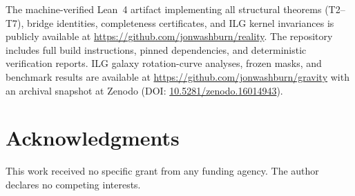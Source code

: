 \documentclass[11pt]{article}
\begin{document}
The machine-verified Lean~4 artifact implementing all structural theorems (T2--T7), bridge identities, completeness certificates, and ILG kernel invariances is publicly available at \href{https://github.com/jonwashburn/reality}{https://github.com/jonwashburn/reality}. The repository includes full build instructions, pinned dependencies, and deterministic verification reports. ILG galaxy rotation-curve analyses, frozen masks, and benchmark results are available at \href{https://github.com/jonwashburn/gravity}{https://github.com/jonwashburn/gravity} with an archival snapshot at Zenodo (DOI: \href{https://doi.org/10.5281/zenodo.16014943}{10.5281/zenodo.16014943}).

\section*{Acknowledgments}

This work received no specific grant from any funding agency. The author declares no competing interests.
\end{document}
